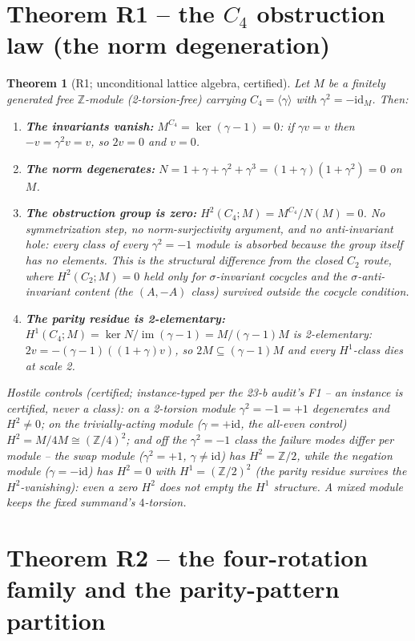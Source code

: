 \documentclass[11pt]{article}
\newtheorem{theorem}{Theorem}
\newcommand{\Z}{\mathbb Z}
\begin{document}
\section{Theorem R1 -- the $C_4$ obstruction law (the norm degeneration)}

\begin{theorem}[R1; unconditional lattice algebra, certified]
Let $M$ be a finitely generated free $\Z$-module (2-torsion-free) carrying
$C_4=\langle\gamma\rangle$ with $\gamma^2=-\mathrm{id}_M$. Then:
\begin{enumerate}
\item \textbf{The invariants vanish:} $M^{C_4}=\ker(\gamma-1)=0$: if
$\gamma v=v$ then $-v=\gamma^2 v=v$, so $2v=0$ and $v=0$.
\item \textbf{The norm degenerates:}
$N=1+\gamma+\gamma^2+\gamma^3=(1+\gamma)(1+\gamma^2)=0$ on $M$.
\item \textbf{The obstruction group is zero:} $H^2(C_4;M)=
M^{C_4}/N(M)=0$. \emph{No symmetrization step, no norm-surjectivity
argument, and no anti-invariant hole}: every class of every
$\gamma^2=-1$ module is absorbed because the group itself has no
elements. This is the structural difference from the closed $C_2$ route,
where $H^2(C_2;M)=0$ held only for $\sigma$-invariant cocycles and the
$\sigma$-anti-invariant content (the $(A,-A)$ class) survived outside
the cocycle condition.
\item \textbf{The parity residue is 2-elementary:}
$H^1(C_4;M)=\ker N/\operatorname{im}(\gamma-1)=M/(\gamma-1)M$ is
2-elementary: $2v=-(\gamma-1)((1+\gamma)v)$, so $2M\subseteq
(\gamma-1)M$ and every $H^1$-class dies at scale 2.
\end{enumerate}
Hostile controls (certified; instance-typed per the 23-b audit's
F1 -- an instance is certified, never a class): on a 2-torsion module
$\gamma^2=-1=+1$ degenerates and $H^2\ne0$; on the
\emph{trivially-acting} module ($\gamma=+\mathrm{id}$, the all-even
control) $H^2=M/4M\cong(\Z/4)^2$; and off the $\gamma^2=-1$ class
the failure modes differ per module -- the \emph{swap} module
($\gamma^2=+1$, $\gamma\ne\mathrm{id}$) has $H^2=\Z/2$, while the
\emph{negation} module ($\gamma=-\mathrm{id}$) has $H^2=0$ with
$H^1=(\Z/2)^2$ (the parity residue survives the $H^2$-vanishing): even
a zero $H^2$ does not empty the $H^1$ structure. A mixed module keeps
the fixed summand's $4$-torsion.
\end{theorem}

\section{Theorem R2 -- the four-rotation family and the parity-pattern partition}
\end{document}
